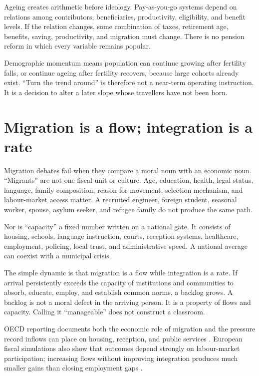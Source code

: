 \documentclass[12pt,a4paper]{book}
\begin{document}
Ageing creates arithmetic before ideology.  Pay-as-you-go systems depend on
relations among contributors, beneficiaries, productivity, eligibility, and
benefit levels.  If the relation changes, some combination of taxes,
retirement age, benefits, saving, productivity, and migration must change.
There is no pension reform in which every variable remains popular.

Demographic momentum means population can continue growing after fertility
falls, or continue ageing after fertility recovers, because large cohorts
already exist.  ``Turn the trend around'' is therefore not a near-term operating
instruction.  It is a decision to alter a later slope whose travellers have
not been born.

\section{Migration is a flow; integration is a rate}

Migration debates fail when they compare a moral noun with an economic noun.
``Migrants'' are not one fiscal unit or culture.  Age, education, health, legal
status, language, family composition, reason for movement, selection mechanism,
and labour-market access matter.  A recruited engineer, foreign student,
seasonal worker, spouse, asylum seeker, and refugee family do not produce the
same path.

Nor is ``capacity'' a fixed number written on a national gate.  It consists of
housing, schools, language instruction, courts, reception systems, healthcare,
employment, policing, local trust, and administrative speed.  A national
average can coexist with a municipal crisis.

The simple dynamic is that migration is a flow while integration is a rate.
If arrival persistently exceeds the capacity of institutions and communities
to absorb, educate, employ, and establish common norms, a backlog grows.  A
backlog is not a moral defect in the arriving person.  It is a property of
flows and capacity.  Calling it ``manageable'' does not construct a classroom.

OECD reporting documents both the economic role of migration and the pressure
record inflows can place on housing, reception, and public services
\cite{OECDMigrationOutlook2024}.  European fiscal simulations also show that
outcomes depend strongly on labour-market participation; increasing flows
without improving integration produces much smaller gains than closing
employment gaps \cite{JRCFiscalMigration2020}.
\end{document}
